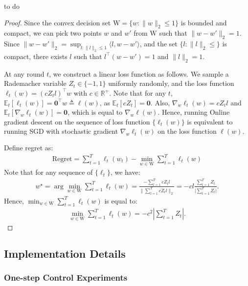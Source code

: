 \begin{corollary}
to do
\end{corollary}
\begin{proof}
Since the convex decision set $\mathrm{W} = \{w: \|w\|_{2}\leq 1\}$ is bounded and compact, we can pick two points $w$ and $w'$ from $\mathrm{W}$ such that $\| w - w'\|_2 = 1$. Since $\|w - w'\|_2 = \sup_{l:\|l\|_2\leq 1}\langle l, w - w' \rangle$, and the set $\{l: \|l\|_2 \leq \}$ is compact, there exists $l$ such that $l^{\top}(w- w') = 1$ and $\|l\|_2 = 1$.

At any round $t$, we construct a linear loss function as follows. We sample a Rademacher variable $Z_t \in \{-1,1\}$ uniformly randomly, and the loss function $\ell_t(w) = (c Z_t l)^{\top} w$ with $c\in\mathbb{R}^+$.  Note that for any $t$, $\mathbb{E}_t[\ell_t(w)] = \mathbf{0}^{\top} w \triangleq \ell(w)$, as $\mathbb{E}_t [c Z_t] = \mathbf{0}$. Also, $\nabla_{w} \ell_t(w) = c Z_t l$ and $\mathbb{E}_{t}[\nabla_{w}\ell_t(w)] = \mathbf{0}$, which is equal to $\nabla_{w} \ell(w)$. Hence, running Online gradient descent on the sequence of loss function $\{\ell_t(w)\}$ is equivalent to running SGD with stochastic gradient $\nabla_{w} \ell_t(w)$ on the loss function $\ell(w)$.

Define regret as:
\begin{align*}
    \mathrm{Regret} = \sum_{t=1}^T \ell_t(w_t) - \min_{w\in\mathrm{W}} \sum_{t=1}^{T} \ell_t(w)
\end{align*} Note that for any sequence of $\{\ell_t\}$, we have:
\begin{align*}
    w^{\star} = \arg\min_{w\in\mathrm{W}} \sum_{t=1}^T \ell_t(w) = \frac{-\sum_{t=1}^{T} c Z_t l}{\|\sum_{t=1}^{T} c Z_t l\|_2} = -c l \frac{\sum_{t=1}^T Z_t} {\lvert\sum_{t=1}^T Z_t\rvert}.
\end{align*} Hence, $\min_{w\in\mathrm{W}} \sum_{t=1}^T \ell_t(w)$ is equal to:
\begin{align*}
   \min_{w\in\mathrm{W}} \sum_{t=1}^T \ell_t(w) = -c^2 \left\lvert \sum_{t=1}^T Z_t  \right\rvert.
\end{align*}



\end{proof}
\fi

\subsection{Implementation Details}
\label{sec:impl-deta}

\subsubsection{One-step Control Experiments}
\label{sec:one-step-control-1}

